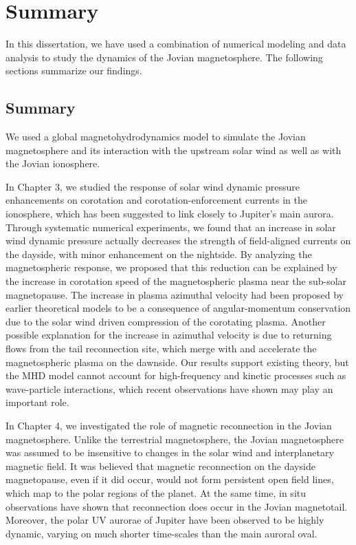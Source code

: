 \chapter{Summary}

In this dissertation, we have used a combination of numerical modeling and  data analysis to study the dynamics of the Jovian magnetosphere. The following sections summarize our findings.

\section{Summary}
We used a global magnetohydrodynamics model to simulate the Jovian magnetosphere and its interaction with the upstream solar wind as well as with the Jovian ionosphere. 

In Chapter 3, we studied the response of solar wind dynamic pressure enhancements on corotation and corotation-enforcement currents in the ionosphere, which has been suggested to link closely to Jupiter's main aurora. Through systematic numerical experiments, we found that an increase in solar wind dynamic pressure actually decreases the strength of field-aligned currents on the dayside, with minor enhancement on the nightside. By analyzing the magnetospheric response, we proposed that this reduction can be explained by the increase in corotation speed of the magnetospheric plasma near the sub-solar magnetopause. The increase in plasma azimuthal velocity had been proposed by earlier theoretical models to be a consequence of angular-momentum conservation due to the solar wind driven compression of the corotating plasma. Another possible explanation for the increase in azimuthal velocity is due to returning flows from the tail reconnection site, which merge with and accelerate the magnetospheric plasma on the dawnside. Our results support existing theory, but the MHD model cannot account for high-frequency and kinetic processes such as wave-particle interactions, which recent observations have shown may play an important role. 

In Chapter 4, we investigated the role of magnetic reconnection in the Jovian magnetosphere. Unlike the terrestrial magnetosphere, the Jovian magnetosphere was assumed to be insensitive to changes in the solar wind and interplanetary magnetic field. It was believed that magnetic reconnection on the dayside magnetopause, even if it did occur, would not form persistent open field lines, which map to the polar regions of the planet. At the same time, in situ observations have shown that reconnection does occur in the Jovian magnetotail. Moreover, the polar UV aurorae of Jupiter have been observed to be highly dynamic, varying on much shorter time-scales than the main auroral oval.


